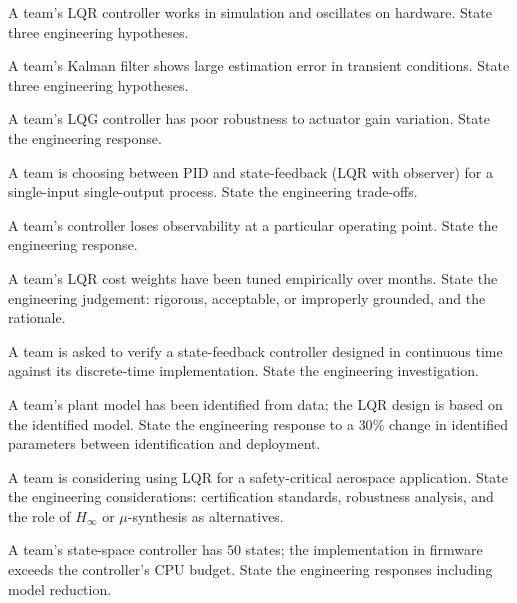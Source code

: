 \begin{exercise}
A team's LQR controller works in simulation and oscillates on hardware. State three engineering hypotheses.
\end{exercise}

\begin{exercise}
A team's Kalman filter shows large estimation error in transient conditions. State three engineering hypotheses.
\end{exercise}

\begin{exercise}
A team's LQG controller has poor robustness to actuator gain variation. State the engineering response.
\end{exercise}

\begin{exercise}
A team is choosing between PID and state-feedback (LQR with observer) for a single-input single-output process. State the engineering trade-offs.
\end{exercise}

\begin{exercise}
A team's controller loses observability at a particular operating point. State the engineering response.
\end{exercise}

\begin{exercise}
A team's LQR cost weights have been tuned empirically over months. State the engineering judgement: rigorous, acceptable, or improperly grounded, and the rationale.
\end{exercise}

\begin{exercise}
A team is asked to verify a state-feedback controller designed in continuous time against its discrete-time implementation. State the engineering investigation.
\end{exercise}

\begin{exercise}
A team's plant model has been identified from data; the LQR design is based on the identified model. State the engineering response to a $30\%$ change in identified parameters between identification and deployment.
\end{exercise}

\begin{exercise}
A team is considering using LQR for a safety-critical aerospace application. State the engineering considerations: certification standards, robustness analysis, and the role of $H_\infty$ or $\mu$-synthesis as alternatives.
\end{exercise}

\begin{exercise}
A team's state-space controller has $50$ states; the implementation in firmware exceeds the controller's CPU budget. State the engineering responses including model reduction.
\end{exercise}
